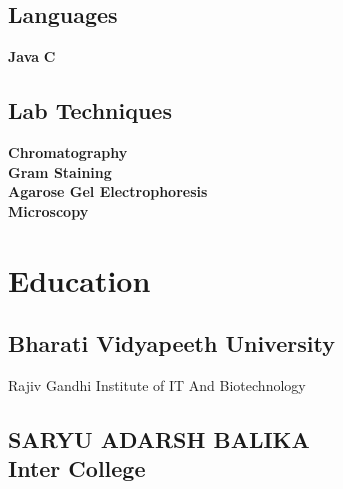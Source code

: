 \documentclass[]{kajalverse-resume}
\begin{document}
\begin{minipage}[t]{0.33\textwidth}
\subsection{}
\subsection{Languages}
 \textbullet{} \textbf{Java} \textbullet{} \textbf{C}

\subsection{}
{\subsection{Lab Techniques}}
{
\textbullet{} \textbf{Chromatography} \\
\textbullet{} \textbf{Gram Staining} \\
\textbullet{} \textbf{Agarose Gel Electrophoresis} \\
\textbullet{} \textbf{Microscopy}
}

% 

\sectionsep

\section{Education}

\subsection{Bharati Vidyapeeth University}
Rajiv Gandhi Institute of IT And Biotechnology\\
\sectionsep

\subsection{SARYU ADARSH BALIKA \\ Inter College}
\sectionsep


\end{minipage}
\end{document}
